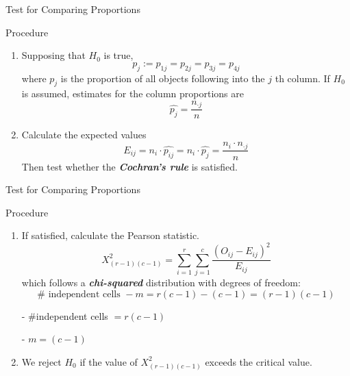 \documentclass{beamer}
\newcommand{\bb}[1]{\textcolor{antiquefuchsia}{\textbf{\textit{#1}}}}
\begin{document}
\begin{frame}{Test for Comparing Proportions}
\begin{block}{Procedure}
\begin{enumerate}

\item Supposing that $H_{0}$ is true,
$$
p_{j}:=p_{1 j}=p_{2 j}=p_{3 j}=p_{4 j}
$$
where $p_{j}$ is the proportion of all objects following into the $j$ th column. If $H_{0}$ is assumed, estimates for the column proportions are
$$
\widehat{p_{j}}=\frac{n_{\cdot j}}{n}
$$
\item Calculate the expected values
$$
E_{i j}=n_{i} \cdot \widehat{p_{i j}}=n_{i} \cdot \widehat{p_{j}}=\frac{n_{i} \cdot n_{\cdot j}}{n}
$$
Then test whether the \bb{Cochran's rule} is satisfied.
\end{enumerate}
\end{block}
\end{frame}

\begin{frame}{Test for Comparing Proportions}
\begin{block}{Procedure}
\begin{enumerate}
\item If satisfied, calculate the Pearson statistic.
$$
X_{(r-1)(c-1)}^{2}=\sum_{i=1}^{r} \sum_{j=1}^{c} \frac{\left(O_{i j}-E_{i j}\right)^{2}}{E_{i j}}
$$
which follows a \bb{chi-squared} distribution with degrees of freedom:
$$
\# \text { independent cells }-m=r(c-1)-(c-1)=(r-1)(c-1)
$$

\begin{center}
- \#independent cells $=r(c-1)$ 

- $m=(c-1)$ 
\end{center}
\item We reject $H_{0}$ if the value of $X_{(r-1)(c-1)}^{2}$ exceeds the critical value.
\end{enumerate}
\end{block}
\end{frame}
\end{document}
